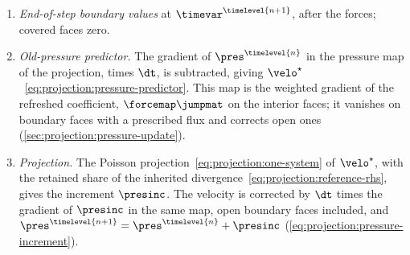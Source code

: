 \begin{enumerate}
  (\cref{eq:forces:coefficient}) and, for unequal densities, its
  preconditioner is refreshed. Then
  $\velo^{\stage{3}}=\velo^{\stage{2}}+\dt\forcemap\fjump{\surftens}+\dt\forcemap\fjump{\gravacc}$,
  surface tension first, each term only if $\surftens>0$ or
  $\gravacc\neq\mathbf{0}$ (\cref{sec:forces:time}). With one phase
  $\velo^{\stage{3}}=\velo^{\stage{2}}$.
\item \emph{End-of-step boundary values} at $\timevar^{\timelevel{n+1}}$,
  after the forces; covered faces zero.
\item \emph{Old-pressure predictor.} The gradient of $\pres^{\timelevel{n}}$
  in the pressure map of the projection, times $\dt$, is subtracted, giving
  $\velo^{\star}$~\cref{eq:projection:pressure-predictor}. This map is the
  weighted gradient of the refreshed coefficient, $\forcemap\jumpmat$ on
  the interior faces; it vanishes on boundary faces with a prescribed flux
  and corrects open ones (\cref{sec:projection:pressure-update}).
\item \emph{Projection.} The Poisson
  projection~\cref{eq:projection:one-system} of $\velo^{\star}$, with the
  retained share of the inherited
  divergence~\cref{eq:projection:reference-rhs}, gives the increment
  $\presinc$. The velocity is corrected by $\dt$ times the gradient of
  $\presinc$ in the same map, open boundary faces included, and
  $\pres^{\timelevel{n+1}}=\pres^{\timelevel{n}}+\presinc$
  (\cref{eq:projection:pressure-increment}).
\end{enumerate}

